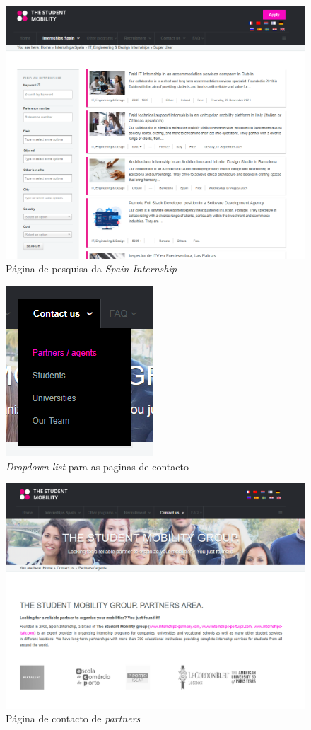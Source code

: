 \begin{figure}[h!tbp]
    \centering
    \includegraphics[width=0.9\linewidth]{capitulos/cap2-estadodaarte/assets/image/spain-internship/spain-search.png}
    \caption{Página de pesquisa da \textit{Spain Internship}}
    \label{fig:spain-search}
\end{figure}

\begin{figure}[h!tbp]
    \centering
    \includegraphics[width=0.3\linewidth]{capitulos/cap2-estadodaarte/assets/image/spain-internship/spain-contact-list.png}
    \caption{\textit{Dropdown list} para as paginas de contacto}
    \label{fig:spain-contact-list}
\end{figure}

\begin{figure}[h!tbp]
    \centering
    \includegraphics[width=0.7\linewidth]{capitulos/cap2-estadodaarte/assets/image/spain-internship/spain-contact-partners.png}
    \caption{Página de contacto de \textit{partners}}
    \label{fig:spain-contact-partners}
\end{figure}

